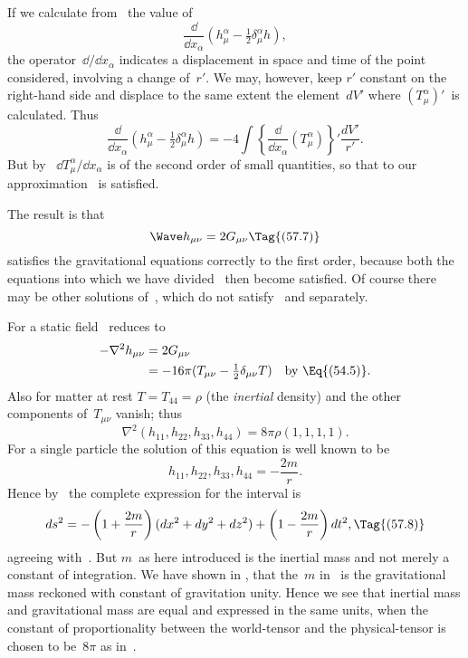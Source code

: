 \documentclass[12pt]{book}
\begin{document}
If we calculate from~ the value of
\[
\frac{\dd}{\dd x_{\alpha}} (h_{\mu}^{\alpha} - \tfrac{1}{2} \delta_{\mu}^{\alpha} h),
\]
the operator~$\dd/\dd x_{\alpha}$ indicates a displacement in space and time of the point
considered, involving a change of~$r'$. We may, however, keep $r'$ constant on the
right-hand side and displace to the same extent the element~$dV'$ where $(T_{\mu}^{\alpha})'$~is
calculated. Thus
\[
\frac{\dd}{\dd x_{\alpha}} (h_{\mu}^{\alpha} - \tfrac{1}{2} \delta_{\mu}^{\alpha} h)
= -4\int \left\{\frac{\dd}{\dd x_{\alpha}}(T_{\mu}^{\alpha})\right\}' \frac{dV'}{r'}.
\]
But by~ $\dd T_{\mu}^{\alpha}/\dd x_{\alpha}$ is of the second order of small quantities, so that to our
approximation ~is satisfied.

The result is that
\[
\Wave h_{\mu\nu} = 2G_{\mu\nu}
\Tag{(57.7)}
\]
satisfies the gravitational equations correctly to the first order, because both
the equations into which we have divided~ then become satisfied. Of
course there may be other solutions of~, which do not satisfy ~and
 separately.

For a static field ~reduces to
\begin{align*}
  -\nabla^2 h_{\mu\nu}
  &= 2G_{\mu\nu} \\
  &= -16\pi (T_{\mu\nu} - \tfrac{1}{2} \delta_{\mu\nu}T)
  \quad\text{by~\Eq{(54.5)}.}
\end{align*}
Also for matter at rest $T = T_{44} = \rho$ (the \emph{inertial} density) and the other components
of~$T_{\mu\nu}$ vanish; thus
\[
\nabla^2 (h_{11}, h_{22}, h_{33}, h_{44}) = 8\pi\rho(1, 1, 1, 1).
\]
For a single particle the solution of this equation is well known to be
\[
h_{11}, h_{22}, h_{33}, h_{44} = -\frac{2m}{r}.
\]
Hence by~ the complete expression for the interval is
\[
ds^{2} = -\left(1 + \frac{2m}{r}\right)(dx^{2} + dy^{2} + dz^{2})
  + \left(1 - \frac{2m}{r}\right) dt^{2},
\Tag{(57.8)}
\]
agreeing with~. But $m$~as here introduced is the inertial mass and not
%
%
%
merely a constant of integration. We have shown in ,  that the~$m$ in~
is the gravitational mass reckoned with constant of gravitation unity.
Hence we see that inertial mass and gravitational mass are equal and expressed
in the same units, when the constant of proportionality between the
world\hyp{}tensor and the physical\hyp{}tensor is chosen to be~$8\pi$ as in~.
\end{document}
